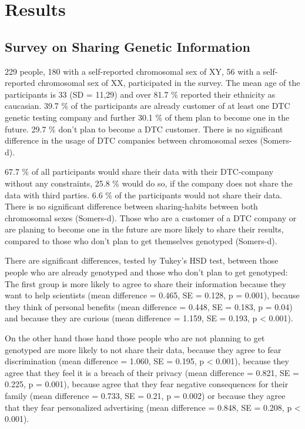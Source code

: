 \documentclass[10pt]{article}
\begin{document}
\section*{Results}

\subsection*{Survey on Sharing Genetic Information}
229 people, 180 with a self-reported chromosomal sex of XY, 56 with a self-reported chromosomal sex of XX, participated in the survey. The mean age of the participants is 33 (SD = 11,29) and over 81.7 \% reported their ethnicity as caucasian. 39.7 \% of the participants are already customer of at least one DTC genetic testing company and further 30.1 \% of them plan to become one in the future. 29.7 \% don't plan to become a DTC customer. There is no significant difference in the usage of DTC companies between chromosomal sexes (Somers-d). 

67.7 \% of all participants would share their data with their DTC-company without any constraints, 25.8 \% would do so, if the company does not share the data with third parties. 6.6 \% of the participants would not share their data. There is no significant difference between sharing-habits between both chromosomal sexes (Somers-d). Those who are a customer of a DTC company or are planing to become one in the future are more likely to share their results, compared to those who don't plan to get themselves genotyped (Somers-d). 

There are significant differences, tested by Tukey's HSD test, between those people who are already genotyped and those who don't plan to get genotyped: The first group is more likely to agree to share their information because they want to help scientists (mean difference = 0.465, SE = 0.128, p = 0.001), because they think of personal benefits (mean difference = 0.448, SE = 0.183, p = 0.04) and because they are curious (mean difference = 1.159, SE = 0.193, p < 0.001). 

On the other hand those hand those people who are not planning to get genotyped are more likely to not share their data, because they agree to fear discrimination (mean difference = 1.060, SE = 0.195, p < 0.001), because they agree that they feel it is a breach of their privacy (mean difference = 0.821, SE = 0.225, p = 0.001), because agree that they fear negative consequences for their family (mean difference = 0.733, SE = 0.21, p = 0.002) or because they agree that they fear personalized advertising (mean difference = 0.848, SE = 0.208, p < 0.001).
\end{document}
